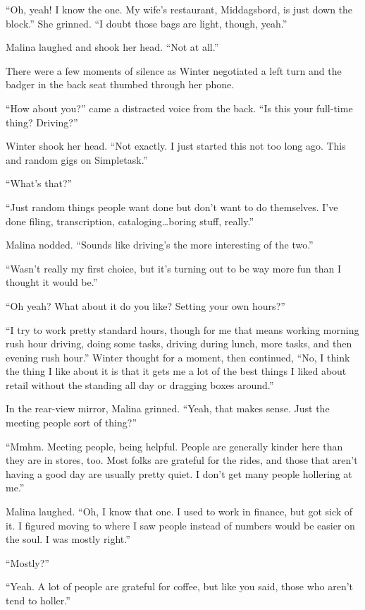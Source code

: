 ``Oh, yeah! I know the one. My wife's restaurant, Middagsbord, is just down the block.'' She grinned. ``I doubt those bags are light, though, yeah.''

Malina laughed and shook her head. ``Not at all.''

There were a few moments of silence as Winter negotiated a left turn and the badger in the back seat thumbed through her phone.

``How about you?'' came a distracted voice from the back. ``Is this your full-time thing? Driving?''

Winter shook her head. ``Not exactly. I just started this not too long ago. This and random gigs on Simpletask.''

``What's that?''

``Just random things people want done but don't want to do themselves. I've done filing, transcription, cataloging\ldots boring stuff, really.''

Malina nodded. ``Sounds like driving's the more interesting of the two.''

``Wasn't really my first choice, but it's turning out to be way more fun than I thought it would be.''

``Oh yeah? What about it do you like? Setting your own hours?''

``I try to work pretty standard hours, though for me that means working morning rush hour driving, doing some tasks, driving during lunch, more tasks, and then evening rush hour.'' Winter thought for a moment, then continued, ``No, I think the thing I like about it is that it gets me a lot of the best things I liked about retail without the standing all day or dragging boxes around.''

In the rear-view mirror, Malina grinned. ``Yeah, that makes sense. Just the meeting people sort of thing?''

``Mmhm. Meeting people, being helpful. People are generally kinder here than they are in stores, too. Most folks are grateful for the rides, and those that aren't having a good day are usually pretty quiet. I don't get many people hollering at me.''

Malina laughed. ``Oh, I know that one. I used to work in finance, but got sick of it. I figured moving to where I saw people instead of numbers would be easier on the soul. I was mostly right.''

``Mostly?''

``Yeah. A lot of people are grateful for coffee, but like you said, those who aren't tend to holler.''

